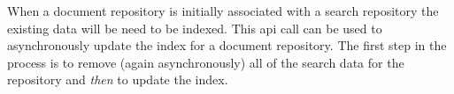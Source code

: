 When a document repository is initially associated with a search repository the
existing data will be need to be indexed. This api call can be used to
asynchronously update the index for a document repository. The first step in
the process is to remove (again asynchronously) all of the search data for
the repository and \emph{then} to update the index.
